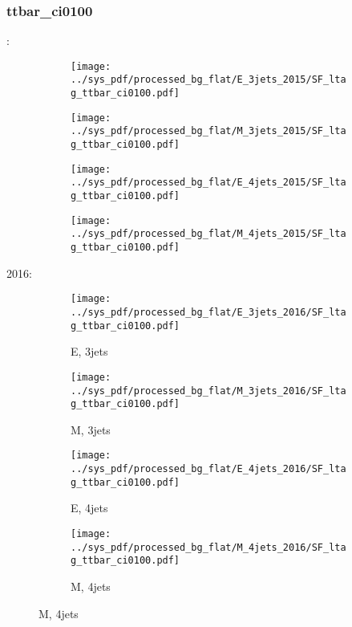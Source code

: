 \documentclass{beamer}
\begin{document}
\begin{frame}
\frametitle{ttbar_ci0100}
\fontsize{5}{1}:
\begin{figure}
\centering
\begin{subfigure}[b]{0.24\textwidth}
\texttt{[image: ../sys\_pdf/processed\_bg\_flat/E\_3jets\_2015/SF\_ltag\_ttbar\_ci0100.pdf]}
\end{subfigure}
\begin{subfigure}[b]{0.24\textwidth}
\texttt{[image: ../sys\_pdf/processed\_bg\_flat/M\_3jets\_2015/SF\_ltag\_ttbar\_ci0100.pdf]}
\end{subfigure}
\begin{subfigure}[b]{0.24\textwidth}
\texttt{[image: ../sys\_pdf/processed\_bg\_flat/E\_4jets\_2015/SF\_ltag\_ttbar\_ci0100.pdf]}
\end{subfigure}
\begin{subfigure}[b]{0.24\textwidth}
\texttt{[image: ../sys\_pdf/processed\_bg\_flat/M\_4jets\_2015/SF\_ltag\_ttbar\_ci0100.pdf]}
\end{subfigure}
\end{figure}
2016:
\begin{figure}
\centering
\begin{subfigure}[b]{0.24\textwidth}
\texttt{[image: ../sys\_pdf/processed\_bg\_flat/E\_3jets\_2016/SF\_ltag\_ttbar\_ci0100.pdf]}
\captionsetup{font=tiny}
\caption{E, 3jets}
\end{subfigure}
\begin{subfigure}[b]{0.24\textwidth}
\texttt{[image: ../sys\_pdf/processed\_bg\_flat/M\_3jets\_2016/SF\_ltag\_ttbar\_ci0100.pdf]}
\captionsetup{font=tiny}
\caption{M, 3jets}
\end{subfigure}
\begin{subfigure}[b]{0.24\textwidth}
\texttt{[image: ../sys\_pdf/processed\_bg\_flat/E\_4jets\_2016/SF\_ltag\_ttbar\_ci0100.pdf]}
\captionsetup{font=tiny}
\caption{E, 4jets}
\end{subfigure}
\begin{subfigure}[b]{0.24\textwidth}
\texttt{[image: ../sys\_pdf/processed\_bg\_flat/M\_4jets\_2016/SF\_ltag\_ttbar\_ci0100.pdf]}
\captionsetup{font=tiny}
\caption{M, 4jets}
\end{subfigure}
\end{figure}
\end{frame}
\end{document}
